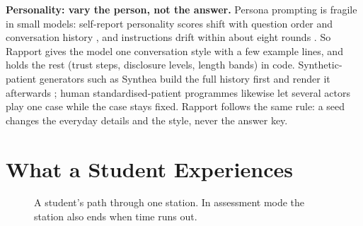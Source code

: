 \documentclass[journal]{IEEEtran}
\begin{document}
\textbf{Personality: vary the person, not the answer.} Persona prompting is fragile in small models: self-report personality scores shift with
question order and conversation history \cite{tosato2025persist}, and instructions drift within about eight rounds \cite{li2024instruction}.
So Rapport gives the model one conversation style with a few example lines, and holds the rest (trust steps, disclosure levels, length bands)
in code. Synthetic-patient generators such as Synthea build the full history first and render it afterwards \cite{walonoski2018synthea}; human
standardised-patient programmes likewise let several actors play one case while the case stays fixed. Rapport follows the same rule: a seed
changes the everyday details and the style, never the answer key.

\section{What a Student Experiences}

\begin{figure}[t]
\centering
{}
\caption{A student's path through one station. In assessment mode the station also ends when time runs out.}
\label{fig:journey}
\end{figure}
\end{document}
